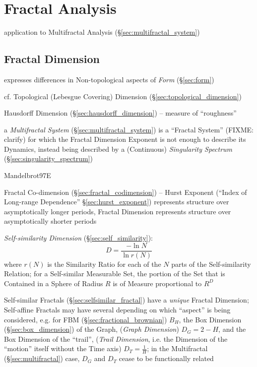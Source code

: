 \section{Fractal Analysis}\label{sec:fractal_analysis}

application to Multifractal Analysis (\S\ref{sec:multifractal_system})



\subsection{Fractal Dimension}\label{sec:fractal_dimension}

expresses differences in Non-topological aspects of \emph{Form}
(\S\ref{sec:form})

cf. Topological (Lebesgue Covering) Dimension
(\S\ref{sec:topological_dimension})

Hausdorff Dimension (\S\ref{sec:hausdorff_dimension}) -- measure of
``roughness''

\fist a \emph{Multifractal System} (\S\ref{sec:multifractal_system}) is a
``Fractal System'' (FIXME: clarify) for which the Fractal Dimension Exponent is
not enough to describe its Dynamics, instead being described by a (Continuous)
\emph{Singularity Spectrum} (\S\ref{sec:singularity_spectrum})

Mandelbrot97E

Fractal Co-dimension (\S\ref{sec:fractal_codimension}) --
Hurst Exponent (``Index of Long-range Dependence'' \S\ref{sec:hurst_exponent})
represents structure over asymptotically longer periods, Fractal Dimension
represents structure over asymptotically shorter periods

\emph{Self-similarity Dimension} (\S\ref{sec:self_similarity}):
\[
  D = \frac{-\ln N}{\ln r(N)}
\]
where $r(N)$ is the Similarity Ratio for each of the $N$ parts of the
Self-similarity Relation;
for a Self-similar Measurable Set, the portion of the Set that is Contained in a
Sphere of Radius $R$ is of Measure proportional to $R^D$

Self-similar Fractals (\S\ref{sec:selfsimilar_fractal}) have a \emph{unique}
Fractal Dimension; Self-affine Fractals may have several depending on which
``aspect'' is being considered, e.g. for FBM (\S\ref{sec:fractional_brownian})
$B_H$, the Box Dimension (\S\ref{sec:box_dimension}) of the Graph,
(\emph{Graph Dimension}) $D_G = 2 - H$, and the Box Dimension of the ``trail'',
(\emph{Trail Dimension}, i.e. the Dimension of the ``motion'' itself without the
Time axis) $D_T = \frac{1}{H}$; in the Multifractal (\S\ref{sec:multifractal})
case, $D_G$ and $D_T$ cease to be functionally related

